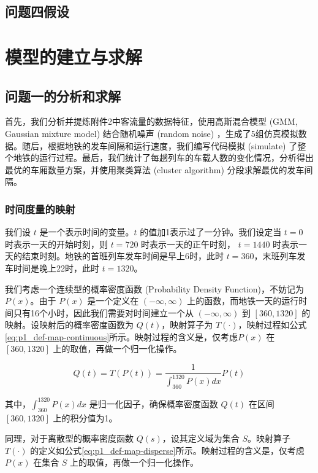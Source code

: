 \documentclass[12pt,a4paper]{mcmthesis}
\begin{document}
    \subsection{问题四假设}


    \section{模型的建立与求解}

    \subsection{问题一的分析和求解}

    首先，我们分析并提炼附件2中客流量的数据特征，使用高斯混合模型 (GMM, Gaussian mixture model) 结合随机噪声 (random noise) ，生成了5组仿真模拟数据。随后，根据地铁的发车间隔和运行速度，我们编写代码模拟 (simulate) 了整个地铁的运行过程。最后，我们统计了每趟列车的车载人数的变化情况，分析得出最优的车厢数量方案，并使用聚类算法 (cluster algorithm) 分段求解最优的发车间隔。

    \subsubsection{时间度量的映射}

    我们设 $t$ 是一个表示时间的变量。$t$ 的值加1表示过了一分钟。我们设定当 $t=0$ 时表示一天的开始时刻，则 $t=720$ 时表示一天的正午时刻， $t=1440$ 时表示一天的结束时刻。地铁的首班列车发车时间是早上6时，此时 $t=360$，末班列车发车时间是晚上22时，此时 $t=1320$。

    我们考虑一个连续型的概率密度函数 (Probability Density Function)，不妨记为 $P(x)$。由于 $P(x)$ 是一个定义在 $(-\infty,\infty)$ 上的函数，而地铁一天的运行时间只有16个小时，因此我们需要对时间建立一个从 $(-\infty,\infty)$ 到 $[360,1320]$ 的映射。设映射后的概率密度函数为 $Q(t)$，映射算子为 $T(\cdot)$，映射过程如公式\ref{eq:p1_def-map-continuous}所示。映射过程的含义是，仅考虑$P(x)$ 在 $[360,1320]$ 上的取值，再做一个归一化操作。

    \begin{equation}
        Q(t) = T(P(t)) = \frac{1}{\int_{360}^{1320}P(x)dx} P(t)
        \label{eq:p1_def-map-continuous}
    \end{equation}

    其中，$\int_{360}^{1320}P(x)dx$ 是归一化因子，确保概率密度函数 $Q(t)$ 在区间 $[360,1320]$ 上的积分值为1。

    同理，对于离散型的概率密度函数 $Q(s)$，设其定义域为集合 $S$。映射算子 $T(\cdot)$ 的定义如公式\ref{eq:p1_def-map-disperse}所示。映射过程的含义是，仅考虑$P(x)$ 在集合 $S$ 上的取值，再做一个归一化操作。
\end{document}
